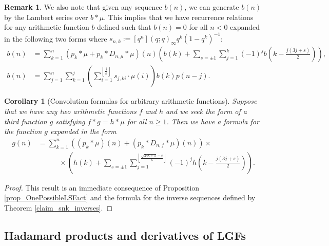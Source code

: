 \documentclass[12pt,reqno,a4letter]{article}
\numberwithin{figure}{section}
\numberwithin{table}{section}
\numberwithin{equation}{section}
\theoremstyle{plain}
\newtheorem{cor}[theorem]{Corollary}
\numberwithin{theorem}{section}
\theoremstyle{definition}
\newtheorem{remark}[theorem]{Remark}
\begin{document}
\begin{remark}
We also note that given any sequence $b(n)$, we can generate $b(n)$ by the 
Lambert series over $b \ast \mu$. This implies that we have recurrence relations for any 
arithmetic function $b$ defined such that $b(n) = 0$ for all $n < 0$ expanded in the 
following two forms where $s_{n,k} := [q^n] (q; q)_{\infty} q^k (1-q^k)^{-1}$: 
\begin{align*} 
b(n) & = \sum_{k=1}^n \left(p_k \ast \mu+p_k \ast D_{n,\mu} \ast \mu\right)(n) \left( 
     b(k) + \sum_{s = \pm 1} \sum_{j=1}^k (-1)^j b\left(k-\frac{j(3j+s)}{2}\right)\right), \\ 
b(n) & = \sum_{j=1}^n \sum_{k=1}^j \left(\sum_{i=1}^{\left\lfloor \frac{j}{k} \right\rfloor} 
     s_{j,ki} \cdot \mu(i)\right) b(k) p(n-j). 
\end{align*}
\end{remark}

\begin{cor}[Convolution formulas for arbitrary arithmetic functions] 
Suppose that we have any two arithmetic functions $f$ and $h$ and we seek the form 
of a third function $g$ satisfying $f \ast g = h \ast \mu$ for all $n \geq 1$. Then we have a formula for the 
function $g$ expanded in the form 
\begin{align*}
g(n) & = \sum_{k=1}^n \left((p_k \ast \mu)(n) + (p_k \ast D_{n,f} \ast \mu)(n)\right) \times \\ 
     & \phantom{=\sum\ } \times 
     \left(h(k) + \sum_{s = \pm 1} \sum_{j=1}^{\left\lfloor \frac{\sqrt{24k+1}-s}{6} \right\rfloor} 
     (-1)^j h\left(k-\frac{j(3j+s)}{2}\right)\right). 
\end{align*} 
\end{cor} 
\begin{proof} 
This result is an immediate consequence of Proposition \ref{prop_OnePossibleLSFact} and the formula 
for the inverse sequences defined by Theorem \ref{claim_snk_inverses}. 
\end{proof} 

\subsection{Hadamard products and derivatives of LGFs} 
\label{subSection_LGFFactThms_HadamardProductsAndDerivativeExps} 
\end{document}
